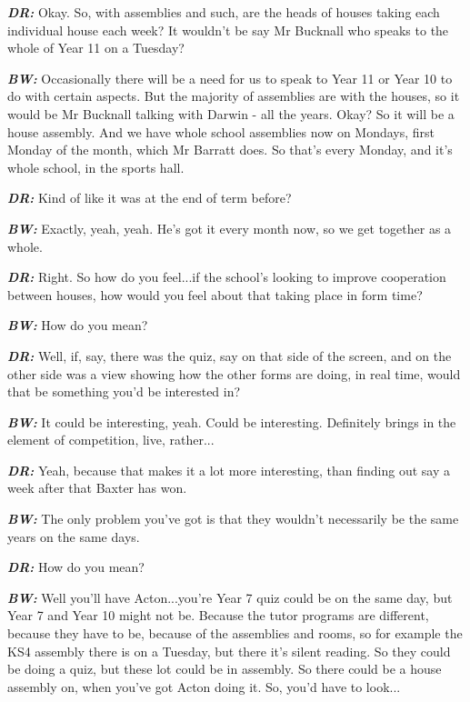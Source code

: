 \textit{\textbf{DR:}} Okay. So, with assemblies and such, are the heads of houses taking each individual house each week? It wouldn't be say Mr Bucknall who speaks to the whole of Year 11 on a Tuesday?

\textit{\textbf{BW:}} Occasionally there will be a need for us to speak to Year 11 or Year 10 to do with certain aspects. But the majority of assemblies are with the houses, so it would be Mr Bucknall talking with Darwin - all the years. Okay? So it will be a house assembly. And we have whole school assemblies now on Mondays, first Monday of the month, which Mr Barratt does. So that's every Monday, and it's whole school, in the sports hall.

\textit{\textbf{DR:}} Kind of like it was at the end of term before?

\textit{\textbf{BW:}} Exactly, yeah, yeah. He's got it every month now, so we get together as a whole.

\textit{\textbf{DR:}} Right. So how do you feel...if the school's looking to improve cooperation between houses, how would you feel about that taking place in form time?

\textit{\textbf{BW:}} How do you mean?

\textit{\textbf{DR:}} Well, if, say, there was the quiz, say on that side of the screen, and on the other side was a view showing how the other forms are doing, in real time, would that be something you'd be interested in?

\textit{\textbf{BW:}} It could be interesting, yeah. Could be interesting. Definitely brings in the element of competition, live, rather...

\textit{\textbf{DR:}} Yeah, because that makes it a lot more interesting, than finding out say a week after that Baxter has won.

\textit{\textbf{BW:}} The only problem you've got is that they wouldn't necessarily be the same years on the same days.

\textit{\textbf{DR:}} How do you mean?

\textit{\textbf{BW:}} Well you'll have Acton...you're Year 7 quiz could be on the same day, but Year 7 and Year 10 might not be. Because the tutor programs are different, because they have to be, because of the assemblies and rooms, so for example the KS4 assembly there is on a Tuesday, but there it's silent reading. So they could be doing a quiz, but these lot could be in assembly. So there could be a house assembly on, when you've got Acton doing it. So, you'd have to look...

